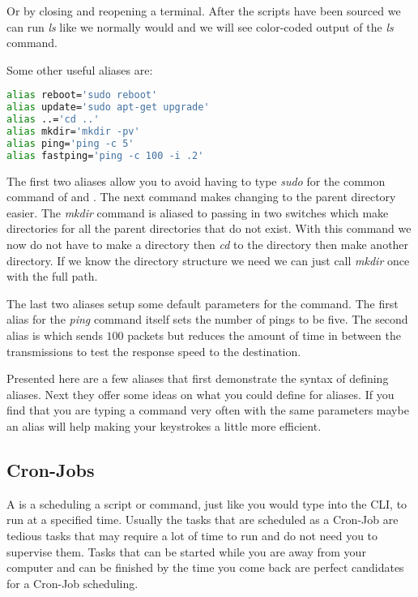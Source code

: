Or by closing and reopening a terminal. After the scripts have been sourced we can run \emph{ls} like we normally would and we will see color-coded output of the \emph{ls} command. 

Some other useful aliases are:

\begin{lstlisting}[language=bash]
alias reboot='sudo reboot'
alias update='sudo apt-get upgrade'
alias ..='cd ..'
alias mkdir='mkdir -pv'
alias ping='ping -c 5'
alias fastping='ping -c 100 -i .2'
\end{lstlisting}
	
The first two aliases allow you to avoid having to type \emph{sudo} for the common command of \emph{} and \emph{}. The next command makes changing to the parent directory easier. The \emph{mkdir} command is aliased to passing in two switches which make directories for all the parent directories that do not exist. With this command we now do not have to make a directory then \emph{cd} to the directory then make another directory. If we know the directory structure we need we can just call \emph{mkdir} once with the full path. 

The last two aliases setup some default parameters for the \emph{} command. The first alias for the \emph{ping} command itself sets the number of pings to be five. The second alias is \emph{} which sends $100$ packets but reduces the amount of time in between the transmissions to test the response speed to the destination. 

Presented here are a few aliases that first demonstrate the syntax of defining aliases. Next they offer some ideas on what you could define for aliases. If you find that you are typing a command very often with the same parameters maybe an alias will help making your keystrokes a little more efficient. 
	
\subsection{Cron-Jobs}

A  is a scheduling a script or command, just like you would type into the \ac{CLI}, to run at a specified time. Usually the tasks that are scheduled as a Cron-Job are tedious tasks that may require a lot of time to run and do not need you to supervise them. Tasks that can be started while you are away from your computer and can be finished by the time you come back are perfect candidates for a Cron-Job scheduling. 
	
